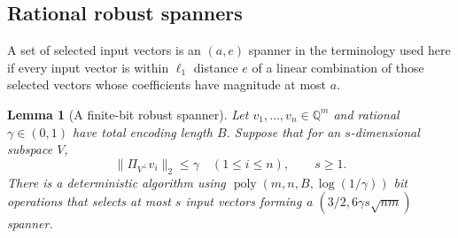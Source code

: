 \documentclass[11pt]{article}
\newcommand{\poly}{\operatorname{poly}}
\newtheorem{lemma}[theorem]{Lemma}
\theoremstyle{definition}
\theoremstyle{remark}
\begin{document}
\subsection{Rational robust spanners}

A set of selected input vectors is an $(a,e)$ spanner in the terminology used here if every input vector is within $\ell_1$ distance $e$ of a linear combination of those selected vectors whose coefficients have magnitude at most $a$.

\begin{lemma}[A finite-bit robust spanner]\label{lem:rational-spanner}
Let $v_1,\ldots,v_n\in\mathbb Q^m$ and rational $\gamma\in(0,1)$ have total encoding length $B$. Suppose that for an $s$-dimensional subspace $V$,
\[
\|\Pi_{V^\perp}v_i\|_2\le\gamma\quad(1\le i\le n),\qquad s\ge1.
\]
There is a deterministic algorithm using
$\poly(m,n,B,\log(1/\gamma))$ bit operations that selects at most $s$ input vectors forming a $(3/2,6\gamma s\sqrt{nm})$ spanner.
\end{lemma}
\end{document}
